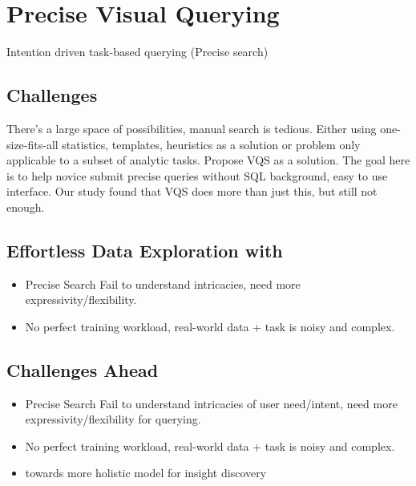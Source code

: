 \section{Precise Visual Querying}
Intention driven task-based querying (Precise search)
\subsection{Challenges}
There’s a large space of possibilities, manual search is tedious. Either using one-size-fits-all statistics, templates, heuristics as a solution or problem only applicable to a subset of analytic tasks\cite{Vartak2015,Vartak2017}. Propose VQS as a solution\cite{Lee2017}. The goal here is to help novice submit precise queries without SQL background, easy to use interface. Our study found that VQS does more than just this, but still not enough.
\subsection{Effortless Data Exploration with \zv}
\begin{itemize}
	\item Precise Search Fail to understand intricacies, need more expressivity/flexibility.
	\item  No perfect training workload, real-world data + task is noisy and complex. 
\end{itemize}

\subsection{Challenges Ahead}
\begin{itemize}
	\item Precise Search Fail to understand intricacies of user need/intent, need more expressivity/flexibility for querying.
	\item  No perfect training workload, real-world data + task is noisy and complex. 
	\item towards more holistic model for insight discovery
\end{itemize}
